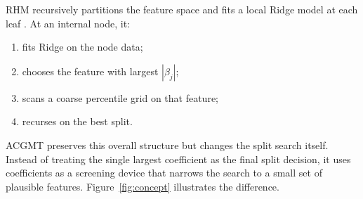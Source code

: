 \documentclass[11pt,a4paper]{article}
\begin{document}
RHM recursively partitions the feature space and fits a local Ridge model at each leaf \citep{rhm2026}. At an internal node, it:
\begin{enumerate}
    \item fits Ridge on the node data;
    \item chooses the feature with largest $|\beta_j|$;
    \item scans a coarse percentile grid on that feature;
    \item recurses on the best split.
\end{enumerate}

ACGMT preserves this overall structure but changes the split search itself. Instead of treating the single largest coefficient as the final split decision, it uses coefficients as a screening device that narrows the search to a small set of plausible features. Figure~\ref{fig:concept} illustrates the difference.
\end{document}
